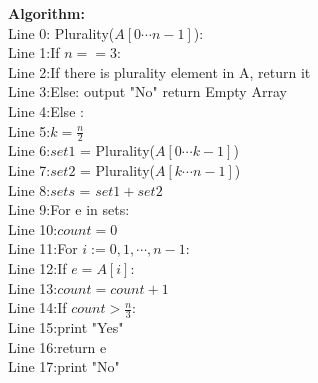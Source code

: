 \documentclass[11pt]{article}
\newcommand{\tab}{\hspace*{2em}}
\begin{document}
\noindent
\textbf{Algorithm:}\\
Line 0: Plurality($A[0\cdots	n-1]$):\\
Line 1:\tab If $n == 3$:\\
Line 2:\tab\tab If there is plurality element in A, return it\\
Line 3:\tab\tab Else: output "No" return Empty Array\\
Line 4:\tab Else :\\
Line 5:\tab\tab $k = \frac{n}{2}$\\
Line 6:\tab\tab $set1$ = Plurality($A[0 \cdots k - 1]$)\\
Line 7:\tab\tab $set2$ = Plurality($A[k \cdots n - 1]$)\\
Line 8:\tab\tab $sets$ = $set1 + set2$\\
Line 9:\tab\tab For e in sets:\\
Line 10:\tab\tab\tab $count = 0$\\
Line 11:\tab\tab\tab For $i:= 0,1,\cdots, n-1:$\\
Line 12:\tab\tab\tab\tab If $e = A[i]$:\\
Line 13:\tab\tab\tab\tab\tab $count = count + 1$\\
Line 14:\tab\tab\tab If $count > \frac{n}{3}:$\\
Line 15:\tab\tab\tab\tab print "Yes"\\
Line 16:\tab\tab\tab\tab return e\\
Line 17:\tab print "No"\\
\end{document}
